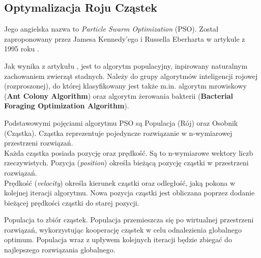 \vspace{1cm}
\subsection{Optymalizacja Roju Cząstek}
\label{PsoOverview}
Jego angielska nazwa to \textit{Particle Swarm Optimization} (PSO).
Został zaproponowany przez Jamesa Kennedy’ego i Russella Eberharta w artykule z 1995 roku \cite{pso:originalPaper}.

Jak wynika z artykułu \cite{pso:implementingInPython}, jest to algorytm populacyjny, inpirowany naturalnym zachowaniem zwierząt stadnych. Należy do grupy algorytmów inteligencji rojowej (rozproszonej), do której klasyfikowany jest także m.in. algorytm mrowiskowy (\textbf{Ant Colony Algorithm}) oraz
algorytm żerowania bakterii (\textbf{Bacterial Foraging Optimization Algorithm}).

Podstawowymi pojęciami algorytmu PSO są Populacja (Rój) oraz Osobnik (Cząstka).
Cząstka \hfill reprezentuje \hfill pojedyncze \hfill rozwiązanie w \hfill n-wymiarowej \hfill przestrzeni \hfill rozwiązań. \\
Każda cząstka posiada pozycję oraz prędkość. Są to n-wymiarowe wektory liczb rzeczywistych. Pozycja \hfill (\textit{position}) \hfill określa \hfill bieżącą \hfill pozycję \hfill cząstki \hfill w \hfill przestrzeni \hfill rozwiązań. \\
Prędkość (\textit{velocity}) określa kierunek cząstki oraz odległość, jaką pokona w kolejnej iteracji algorytmu. Nowa pozycja cząstki jest obliczana poprzez dodanie bieżącej prędkości cząstki do starej pozycji.

Populacja to zbiór cząstek. Populacja przemieszcza się po wirtualnej przestrzeni rozwiązań, wykorzystując kooperację cząstek w celu odnalezienia globalnego optimum.
Populacja wraz z upływem kolejnych iteracji będzie zbiegać do najlepszego rozwiązania globalnego.

